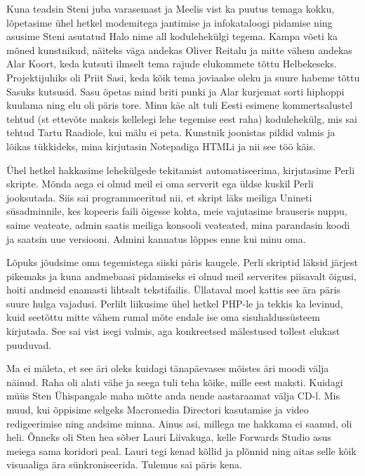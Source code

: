 Kuna teadsin Steni juba varasemast ja Meelis vist ka puutus temaga kokku, 
lõpetasime ühel hetkel modemitega jantimise ja infokataloogi pidamise ning 
asusime Steni asutatud Halo nime all kodulehekülgi tegema. Kampa 
võeti ka mõned kunstnikud, näiteks väga andekas Oliver 
Reitalu ja mitte vähem andekas Alar 
Koort, keda kutsuti ilmselt tema rajude elukommete tõttu 
Helbekeseks. Projektijuhiks oli Priit Sasi, keda 
kõik tema joviaalse oleku ja suure habeme tõttu Sasuks kutsusid. Sasu õpetas 
mind briti punki ja Alar kurjemat sorti hiphoppi kuulama ning elu oli päris tore. 
Minu käe alt tuli Eesti esimene kommertsalustel tehtud 
(st ettevõte maksis kellelegi lehe tegemise eest raha) kodulehekülg, mis sai 
tehtud Tartu Raadiole, kui mälu ei peta. Kunstnik joonistas 
pildid valmis ja lõikas tükkideks, mina kirjutasin Notepadiga HTMLi ja nii see 
töö käis. 

Ühel hetkel hakkasime lehekülgede tekitamist automatiseerima, kirjutasime 
Perli skripte. Mõnda aega ei olnud meil ei oma serverit ega üldse kuskil Perli 
jooksutada. Siis sai programmeeritud nii, et skript läks meiliga
Unineti süsadminnile, kes kopeeris faili õigesse kohta, meie 
vajutasime brauseris nuppu, saime veateate, admin saatis meiliga konsooli 
veateated, mina parandasin koodi ja saatsin uue versiooni. Admini kannatus 
lõppes enne kui minu oma. 

Lõpuks jõudsime oma tegemistega siiski päris kaugele. Perli skriptid läksid 
järjest pikemaks ja kuna andmebaasi pidamiseks ei olnud meil serverites 
piisavalt õigusi, hoiti andmeid enamasti lihtsalt tekstifailis. Üllataval moel 
kattis see ära päris suure hulga vajadusi. Perlilt liikusime ühel hetkel PHP-le 
ja tekkis ka levinud, kuid seetõttu mitte vähem rumal mõte endale ise 
oma sisuhaldussüsteem kirjutada. See sai vist isegi valmis, aga konkreetsed 
mälestused tollest elukast puuduvad.

Ma ei mäleta, et see äri oleks kuidagi tänapäevases mõistes äri moodi välja 
näinud. Raha oli alati vähe ja seega tuli teha kõike, mille eest maksti. Kuidagi 
müüs Sten Ühispangale maha mõtte anda nende aastaraamat välja CD-l. Mis muud, kui
õppisime selgeks Macromedia Directori kasutamise ja video redigeerimise ning 
andsime minna. Ainus asi, millega me hakkama ei saanud, oli heli. Õnneks oli Sten 
hea sõber Lauri Liivakuga, kelle Forwards 
Studio asus meiega sama koridori peal. Lauri 
tegi kenad kõllid ja plõnnid ning aitas selle kõik visuaaliga ära 
sünkroniseerida. Tulemus sai päris kena. 

